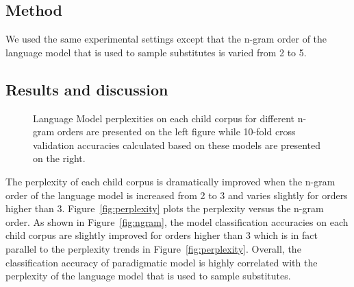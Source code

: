 \subsection{Method}
We used the same experimental settings except that the n-gram order of the
language model that is used to sample substitutes is varied from 2 to
5. 

\subsection{Results and discussion}
\begin{figure}[h!]
  \caption{Language Model perplexities on each child corpus for different
  n-gram orders are presented on the left figure while 10-fold cross validation
  accuracies calculated based on these models are presented on the right.} 
\end{figure}

The perplexity of each child corpus is dramatically improved when the n-gram
order of the language model is increased from 2 to 3 and varies slightly for
orders higher than 3.  Figure~\ref{fig:perplexity} plots the perplexity versus
the n-gram order.  As shown in Figure~\ref{fig:ngram}, the model classification
accuracies on each child corpus are slightly improved for orders higher than 3
which is in fact parallel to the perplexity trends in
Figure~\ref{fig:perplexity}.  Overall, the classification accuracy of
paradigmatic model is highly correlated with the perplexity of the language
model that is used to sample substitutes.

